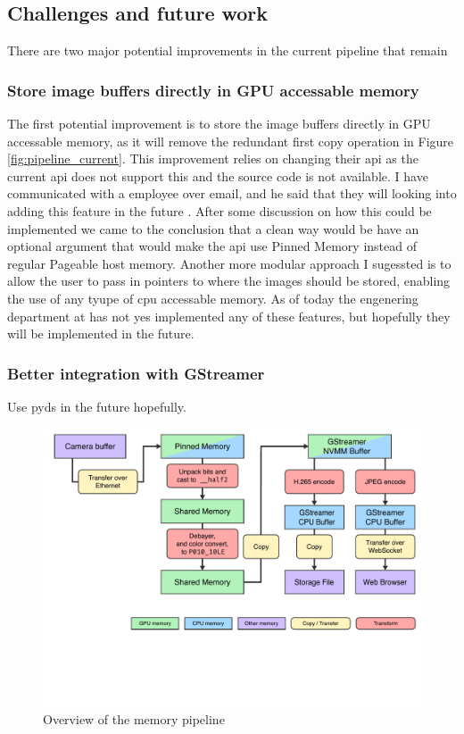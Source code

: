 \subsection{Challenges and future work}
There are two major potential improvements in the current pipeline that remain

\subsubsection{Store image buffers directly in GPU accessable memory}
The first potential improvement is to store the image buffers directly in GPU accessable memory, as it will remove the redundant first copy operation in Figure \ref{fig:pipeline_current}.
This improvement relies on \lucid changing their \gls{api} as the current \gls{api} does not support this and the source code is not available.
I have communicated with a \lucid employee over email, and he said that they will looking into adding this feature in the future \cite{martensRe17896Use2023}.
After some discussion on how this could be implemented we came to the conclusion that a clean way would be have an optional argument that would make the \gls{api} use Pinned Memory instead of regular Pageable host memory.
Another more modular approach I sugessted is to allow the user to pass in pointers to where the images should be stored, enabling the use of any tyupe of \gls{cpu} accessable memory.
As of today the engenering department at \lucid has not yes implemented any of these features, but hopefully they will be implemented in the future.

\subsubsection{Better integration with GStreamer}
Use \gls{pyds} in the future hopefully.

\begin{figure}[H]
    \centering
    \includegraphics[width=\textwidth]{figures/memory_pipeline/optimal.pdf}
    \caption{Overview of the memory pipeline}
    \label{fig:pipeline_optimal}
\end{figure}